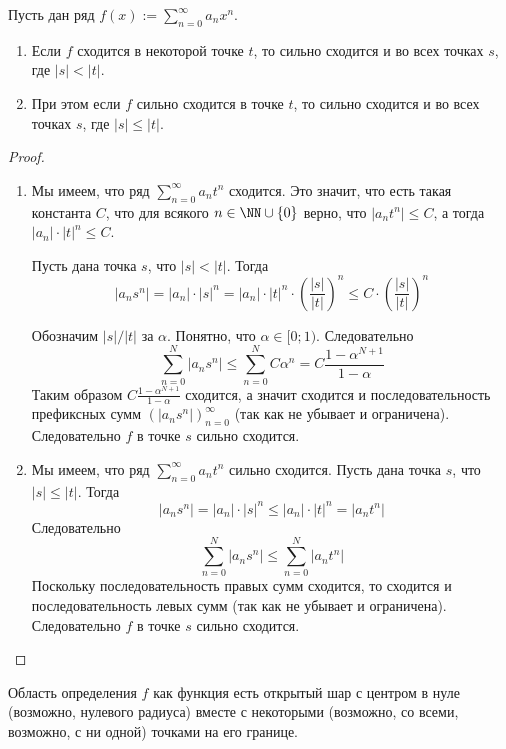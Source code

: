 \documentclass[12pt,a4paper]{article}
\begin{document}
    \begin{theorem}
        Пусть дан ряд $f(x) := \sum_{n=0}^\infty a_n x^n$.
        \begin{enumerate}
            \item Если $f$ сходится в некоторой точке $t$, то сильно сходится и во всех точках $s$, где $|s| < |t|$.
            \item При этом если $f$ сильно сходится в точке $t$, то сильно сходится и во всех точках $s$, где $|s| \leqslant |t|$.
        \end{enumerate}
    \end{theorem}

    \begin{proof}\ 
        \begin{enumerate}
            \item Мы имеем, что ряд $\sum_{n=0}^\infty a_n t^n$ сходится. Это значит, что есть такая константа $C$, что для всякого $n \in \NN \cup \{0\}$ верно, что $|a_n t^n| \leqslant C$, а тогда $|a_n| \cdot |t|^n \leqslant C$.

                Пусть дана точка $s$, что $|s| < |t|$. Тогда
                \[|a_n s^n| = |a_n| \cdot |s|^n = |a_n| \cdot |t|^n \cdot \left(\frac{|s|}{|t|}\right)^n \leqslant C \cdot \left(\frac{|s|}{|t|}\right)^n\]

                Обозначим $|s|/|t|$ за $\alpha$. Понятно, что $\alpha \in [0; 1)$. Следовательно
                \[\sum_{n=0}^N |a_n s^n| \leqslant \sum_{n=0}^N C \alpha^n = C \frac{1 - \alpha^{N+1}}{1 - \alpha}\]
                Таким образом $C \frac{1 - \alpha^{N+1}}{1 - \alpha}$ сходится, а значит сходится и последовательность префиксных сумм $(|a_n s^n|)_{n=0}^\infty$ (так как не убывает и ограничена). Следовательно $f$ в точке $s$ сильно сходится.
            
            \item Мы имеем, что ряд $\sum_{n=0}^\infty a_n t^n$ сильно сходится. Пусть дана точка $s$, что $|s| \leqslant |t|$. Тогда
            \[|a_n s^n| = |a_n| \cdot |s|^n \leqslant |a_n| \cdot |t|^n = |a_n t^n|\]
            Следовательно
            \[\sum_{n=0}^N |a_n s^n| \leqslant \sum_{n=0}^N |a_n t^n|\]
            Поскольку последовательность правых сумм сходится, то сходится и последовательность левых сумм (так как не убывает и ограничена). Следовательно $f$ в точке $s$ сильно сходится.
        \end{enumerate}
    \end{proof}

    \begin{corollary}
        Область определения $f$ как функция есть открытый шар с центром в нуле (возможно, нулевого радиуса) вместе с некоторыми (возможно, со всеми, возможно, с ни одной) точками на его границе.
    \end{corollary}
\end{document}
